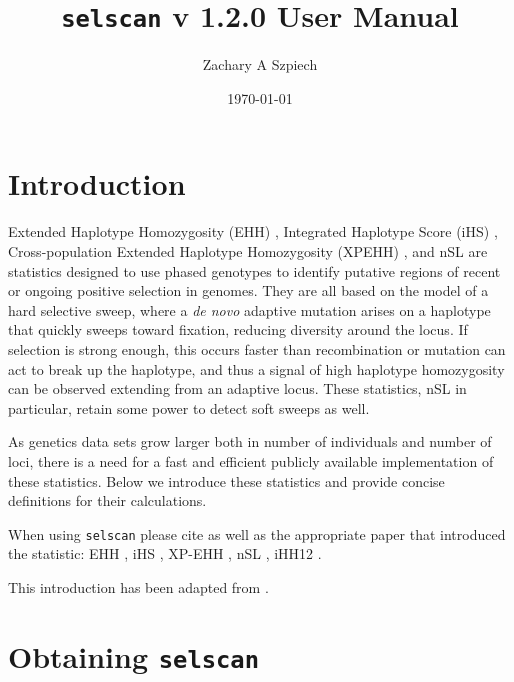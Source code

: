\documentclass[12pt]{article}%
\title{{\tt selscan} v 1.2.0 User Manual}
\date{\today}
\author{Zachary A Szpiech}
\begin{document}
\lstset{breaklines=true,basicstyle=\ttfamily}

\null  %
\nointerlineskip  %
\vfill
\let\snewpage \newpage
\let\newpage \relax
\maketitle
\thispagestyle{empty}
\let \newpage \snewpage
\vfill 
\break %

\tableofcontents 

\newpage

\section{Introduction}

Extended Haplotype Homozygosity (EHH) \cite[]{SabetiEtAl02}, Integrated Haplotype 
Score (iHS) \cite[]{VoightEtAl06}, Cross-population Extended Haplotype 
Homozygosity (XPEHH) \cite[]{SabetiEtAl07}, and nSL \cite[]{FerrerAdmetllaEtAl14} are statistics designed to use phased genotypes to identify putative regions
of recent or ongoing positive selection in genomes.  They are all based on the model of 
a hard selective sweep, where a {\it de novo} adaptive mutation arises on a haplotype
that quickly sweeps toward fixation, reducing diversity around the locus.  If selection is strong enough, this occurs
faster than recombination or mutation can act to break up the haplotype, and thus a signal of high 
haplotype homozygosity can be observed extending from an adaptive locus.  These statistics, nSL in particular, retain some power to detect soft sweeps as well.

As genetics data sets grow larger both in number of individuals and number of loci,
there is a need for a fast and efficient publicly available implementation of these statistics. Below we 
introduce these statistics and provide concise definitions for their calculations.  

When using {\tt selscan} please cite \cite{SzpiechAndHernandez14} as well as the appropriate paper that introduced the statistic: EHH \cite[]{SabetiEtAl02}, iHS \cite[]{VoightEtAl06}, XP-EHH \cite[]{SabetiEtAl07}, nSL \cite[]{FerrerAdmetllaEtAl14}, iHH12 \cite[]{GarudEtAl15, TorresEtAl17}.

This introduction has been adapted from \cite{SzpiechAndHernandez14}.

\section{Obtaining {\tt selscan}}
\end{document}
